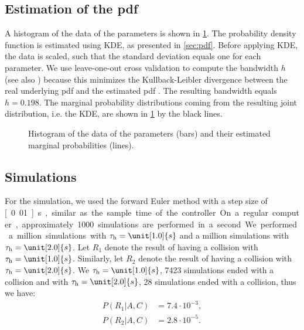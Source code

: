 \subsection{Estimation of the pdf}
\label{sec:example pdf}

A histogram of the data of the parameters is shown in \cref{fig:histogram}. The probability density function is estimated using KDE, as presented in \cref{sec:pdf}. Before applying KDE, the data is scaled, such that the standard deviation equals one for each parameter. We use leave-one-out cross validation to compute the bandwidth $h$ (see also \cite{duin1976parzen}) because this minimizes the Kullback-Leibler divergence between the real underlying pdf and the estimated pdf \cite{turlach1993bandwidthselection,zambom2013review}. The resulting bandwidth equals $h=0.198$. The marginal probability distributions coming from the resulting joint distribution, i.e. the KDE, are shown in \cref{fig:histogram} by the black lines.

\setlength{}
\setlength{}
\begin{figure}
	\centering
	
	\caption{Histogram of the data of the parameters (bars) and their estimated marginal probabilities (lines).}
	\label{fig:histogram}
\end{figure}



\subsection{Simulations}
\label{sec:example simulations}

For the simulation, we used the forward Euler method with a step size of \unit[0.01]{s}, similar as the sample time of the controller. On a regular computer, approximately 1000 simulations are performed in a second. We performed a million simulations with $\tau_{\mathrm{h}}=\unit[1.0]{s}$ and a million simulations with $\tau_{\mathrm{h}}=\unit[2.0]{s}$. Let $R_1$ denote the result of having a collision with $\tau_{\mathrm{h}}=\unit[1.0]{s}$. Similarly, let $R_2$ denote the result of having a collision with $\tau_{\mathrm{h}}=\unit[2.0]{s}$. We $\tau_{\mathrm{h}}=\unit[1.0]{s}$, 7423 simulations ended with a collision and with $\tau_{\mathrm{h}}=\unit[2.0]{s}$, 28 simulations ended with a collision, thus we have:
\begin{align}
	P(R_1|A,C) &= 7.4 \cdot 10^{-3}, \\
	P(R_2|A,C) &= 2.8 \cdot 10^{-5}.
\end{align}

